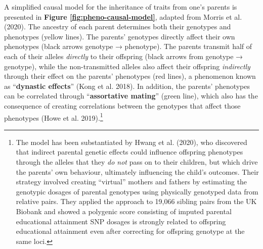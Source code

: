 \documentclass[
]{book}
\begin{document}
A simplified causal model for the inheritance of traits from one's parents is presented in \textbf{Figure \ref{fig:pheno-causal-model}}, adapted from Morris et al. (2020). The ancestry of each parent determines both their genotypes and phenotypes (yellow lines). The parents' genotypes directly affect their own phenotypes (black arrows genotype → phenotype). The parents transmit half of each of their alleles \emph{directly} to their offspring (black arrows from genotype → genotype), while the non-transmitted alleles also affect their offspring \emph{indirectly} through their effect on the parents' phenotypes (red lines), a phenomenon known as ``\textbf{dynastic effects}'' (Kong et al. 2018). In addition, the parents' phenotypes can be correlated through ``\textbf{assortative mating}'' (green line), which also has the consequence of creating correlations between the genotypes that affect those phenotypes (Howe et al. 2019).\footnote{The model has been substantiated by Hwang et al. (2020), who discovered that indirect parental genetic effects could influence offspring phenotypes through the alleles that they \emph{do not} pass on to their children, but which drive the parents' own behaviour, ultimately influencing the child's outcomes. Their strategy involved creating ``virtual'' mothers and fathers by estimating the genotypic dosages of parental genotypes using physically genotyped data from relative pairs. They applied the approach to 19,066 sibling pairs from the UK Biobank and showed a polygenic score consisting of imputed parental educational attainment SNP dosages is strongly related to offspring educational attainment even after correcting for offspring genotype at the same loci.}
\end{document}

